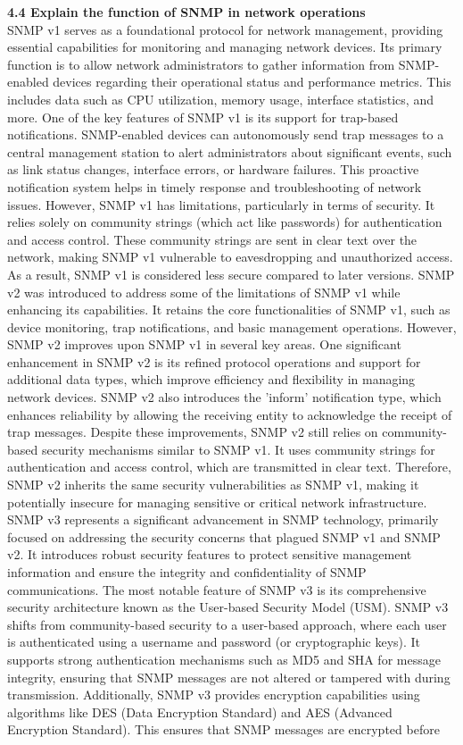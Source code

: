 \documentclass{article}
\begin{document}
\textbf{4.4 Explain the function of SNMP in network operations}\\

	SNMP v1 serves as a foundational protocol for network management, providing essential capabilities for monitoring and managing network devices. Its primary function is to allow network administrators to gather information from SNMP-enabled devices regarding their operational status and performance metrics. This includes data such as CPU utilization, memory usage, interface statistics, and more. One of the key features of SNMP v1 is its support for trap-based notifications. SNMP-enabled devices can autonomously send trap messages to a central management station to alert administrators about significant events, such as link status changes, interface errors, or hardware failures. This proactive notification system helps in timely response and troubleshooting of network issues. However, SNMP v1 has limitations, particularly in terms of security. It relies solely on community strings (which act like passwords) for authentication and access control. These community strings are sent in clear text over the network, making SNMP v1 vulnerable to eavesdropping and unauthorized access. As a result, SNMP v1 is considered less secure compared to later versions. SNMP v2 was introduced to address some of the limitations of SNMP v1 while enhancing its capabilities. It retains the core functionalities of SNMP v1, such as device monitoring, trap notifications, and basic management operations. However, SNMP v2 improves upon SNMP v1 in several key areas. One significant enhancement in SNMP v2 is its refined protocol operations and support for additional data types, which improve efficiency and flexibility in managing network devices. SNMP v2 also introduces the 'inform' notification type, which enhances reliability by allowing the receiving entity to acknowledge the receipt of trap messages. Despite these improvements, SNMP v2 still relies on community-based security mechanisms similar to SNMP v1. It uses community strings for authentication and access control, which are transmitted in clear text. Therefore, SNMP v2 inherits the same security vulnerabilities as SNMP v1, making it potentially insecure for managing sensitive or critical network infrastructure. SNMP v3 represents a significant advancement in SNMP technology, primarily focused on addressing the security concerns that plagued SNMP v1 and SNMP v2. It introduces robust security features to protect sensitive management information and ensure the integrity and confidentiality of SNMP communications. The most notable feature of SNMP v3 is its comprehensive security architecture known as the User-based Security Model (USM). SNMP v3 shifts from community-based security to a user-based approach, where each user is authenticated using a username and password (or cryptographic keys). It supports strong authentication mechanisms such as MD5 and SHA for message integrity, ensuring that SNMP messages are not altered or tampered with during transmission. Additionally, SNMP v3 provides encryption capabilities using algorithms like DES (Data Encryption Standard) and AES (Advanced Encryption Standard). This ensures that SNMP messages are encrypted before 
\end{document}
